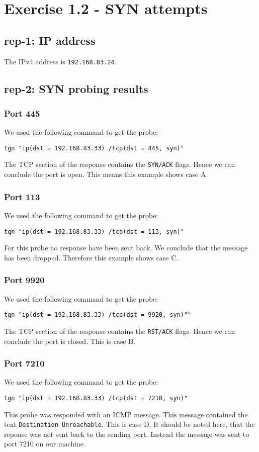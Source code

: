 \section*{Exercise 1.2 - SYN attempts}
\subsection*{rep-1: IP address}
The IPv4 address is \texttt{192.168.83.24}.


\subsection*{rep-2: SYN probing results}

\subsubsection*{Port 445}
We used the following command to get the probe:
\begin{verbatim}
tgn "ip(dst = 192.168.83.33) /tcp(dst = 445, syn)"
\end{verbatim}
The TCP section of the response contains the \texttt{SYN/ACK} flags. Hence we can conclude the port is open. This means this example shows case A.

\subsubsection*{Port 113}
We used the following command to get the probe:
\begin{verbatim}
tgn "ip(dst = 192.168.83.33) /tcp(dst = 113, syn)"
\end{verbatim}
For this probe no response have been sent back. We conclude that the message has been dropped. Therefore this example shows case C.


\subsubsection*{Port 9920}
We used the following command to get the probe:
\begin{verbatim}
tgn "ip(dst = 192.168.83.33) /tcp(dst = 9920, syn)""
\end{verbatim}
The TCP section of the response contains the \texttt{RST/ACK} flags. Hence we can conclude the port is closed. This is case B.


\subsubsection*{Port 7210}
We used the following command to get the probe:
\begin{verbatim}
tgn "ip(dst = 192.168.83.33) /tcp(dst = 7210, syn)"
\end{verbatim}
This probe was responded with an ICMP message. This message contained the text \texttt{Destination Unreachable}. This is case D. It should be noted here, that the reponse was not sent back to the sending port. Instead the message was sent to port 7210 on our machine.



